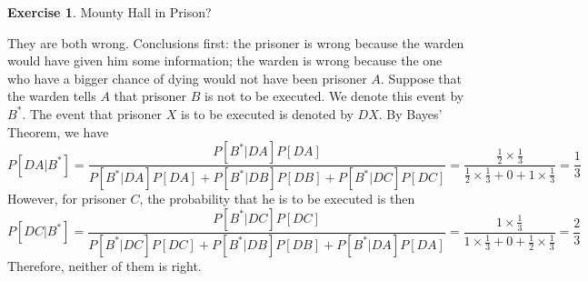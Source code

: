 \documentclass[12pt,a4paper]{article}
\makeatletter
\theoremstyle{definition}
\newtheorem{exercise}{Exercise}
\newtheorem*{solution}{Solution}
\renewenvironment{solution}[1][Solution] {\par\pushQED{\qed}\normalfont\topsep6\p@\@plus6\p@\relax\trivlist\item[\hskip\labelsep\bfseries#1\@addpunct{.}]\ignorespaces}{\popQED\endtrivlist\@endpefalse} \makeatother
\makeatother
\begin{document}
\begin{exercise}
    Mounty Hall in Prison?
    \begin{solution}
        They are both wrong. Conclusions first: the prisoner is wrong because the warden would have given him some information; the warden is wrong because the one who have a bigger chance of dying would not have been prisoner $A$.
        \newline Suppose that the warden tells $A$ that prisoner $B$ is not to be executed. We denote this event by $B^*$. The event that prisoner $X$ is to be executed is denoted by $DX$. By Bayes' Theorem, we have
        \begin{equation*}
            P[DA|B^*]=\frac{P[B^*|DA]P[DA]}{P[B^*|DA]P[DA]+P[B^*|DB]P[DB]+P[B^*|DC]P[DC]}=\frac{\frac{1}{2}\times \frac{1}{3}}{\frac{1}{2}\times \frac{1}{3}+0+1\times \frac{1}{3}}=\frac{1}{3}
        \end{equation*}
        However, for prisoner $C$, the probability that he is to be executed is then
        \begin{equation*}
            P[DC|B^*]=\frac{P[B^*|DC]P[DC]}{P[B^*|DC]P[DC]+P[B^*|DB]P[DB]+P[B^*|DA]P[DA]}=\frac{1\times \frac{1}{3}}{1\times \frac{1}{3}+0+\frac{1}{2}\times \frac{1}{3}}=\frac{2}{3}
        \end{equation*}
        Therefore, neither of them is right.
    \end{solution}
\end{exercise}
\end{document}
